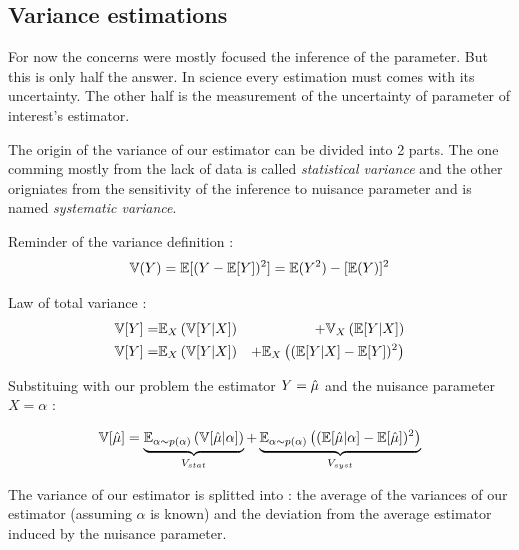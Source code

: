 \subsection{Variance estimations} %
\label{sub:variance_estimations}


For now the concerns were mostly focused the inference of the parameter.
But this is only half the answer.
In science every estimation must comes with its uncertainty.
The other half is the measurement of the uncertainty of parameter of interest's estimator.

The origin of the variance of our estimator can be divided into 2 parts.
The one comming mostly from the lack of data is called \emph{statistical variance} and the other origniates from the sensitivity of the inference to nuisance parameter and is named \emph{systematic variance}.

Reminder of the variance definition :
\begin{equation}
	\mathbb{V}(Y) = \mathbb{E}[(Y - \mathbb{E}[Y])^2] = \mathbb{E}(Y^2) - [\mathbb{E}(Y)]^2
\end{equation}

Law of total variance \needcite :
\begin{eqnarray}
\label{eq:total_variance_law}
    \mathbb{V}[Y] =& \mathbb{E}_X \left (\mathbb{V}[Y|X] \right ) &+ \mathbb{V}_X \left (\mathbb{E}[Y|X]\right ) \\
    \mathbb{V}[Y] =& \mathbb{E}_X \left (\mathbb{V}[Y|X] \right ) &+ \mathbb{E}_X \left ( (\mathbb{E} [Y|X]  - \mathbb{E}[Y])^2\right )
\end{eqnarray}


Substituing with our problem the estimator $Y = \hat\mu$ and the nuisance parameter $X = \alpha$ :

\begin{equation}
\label{eq:stat_and_syst_variance_definition}
\mathbb{V}[\hat\mu] 
	= \underbrace{\mathbb{E}_{\alpha \sim p(\alpha)} \left (\mathbb{V}[\hat\mu | \alpha] \right )}_{V_{stat}} 
	+ \underbrace{\mathbb{E}_{\alpha \sim p(\alpha)} \left ( (\mathbb{E} [\hat\mu | \alpha]  - \mathbb{E}[\hat\mu])^2\right )}_{V_{syst}}
\end{equation}

The variance of our estimator is splitted into :
the average of the variances of our estimator (assuming $\alpha$ is known) and the deviation from the average estimator induced by the nuisance parameter.



